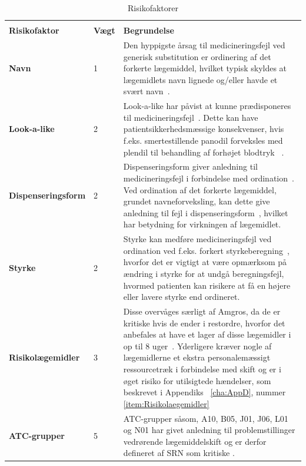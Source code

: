 \begin{longtable}{p{3.5cm}| p{1.0cm} | p{9.2cm}}
	\caption{Risikofaktorer} \vspace{0.2cm}
	\label{table:features} \\
\cellcolor[HTML]{C0C0C0} {\textbf{Risikofaktor}} & \cellcolor[HTML]{C0C0C0} {\textbf{Vægt}} & \cellcolor[HTML]{C0C0C0} {\textbf{Begrundelse}} \\ \hline
\textbf{Navn} & 1 & Den hyppigste årsag til medicineringsfejl ved generisk substitution er ordinering af det forkerte lægemiddel, hvilket typisk skyldes at lægemidlets navn lignede og/eller havde et svært navn~\citep{Hakonsen2010}. \\  \hline 
\textbf{Look-a-like} & 2 & Look-a-like har påvist at kunne prædisponeres til medicineringsfejl~\citep{Wittich2014}. Dette kan have patientsikkerhedsmæssige konsekvenser, hvis f.eks. smertestillende panodil forveksles med plendil til behandling af forhøjet blodtryk ~\citep{DanskSelskabforPatientsikkerhed2009}.\\  \hline 
\textbf{Dispenseringsform} & 2 & Dispenseringsform giver anledning til medicineringsfejl i forbindelse med ordination~\citep{Agrawal2009}. Ved ordination af det forkerte lægemiddel, grundet navneforveksling, kan dette give anledning til fejl i dispenseringsform~\citep{DanskSelskabforPatientsikkerhed2009}, hvilket har betydning for virkningen af lægemidlet.
\\ \hline 
\textbf{Styrke} & 2 & Styrke kan medføre medicineringsfejl ved ordination ved f.eks. forkert styrkeberegning~\citep{Agrawal2009}, hvorfor det er vigtigt at være opmærksom på  ændring i styrke for at undgå beregningsfejl, hvormed patienten kan risikere at få en højere eller lavere styrke end ordineret.\\ \hline
\textbf{Risikolægemidler} & 3 & Disse overvåges særligt af Amgros, da de er kritiske hvis de ender i restordre, hvorfor det anbefales at have et lager af disse lægemidler i op til 8 uger~\citep{Amgros}. Yderligere kræver nogle af lægemidlerne et ekstra personalemæssigt ressourcetræk i forbindelse med skift og er i øget risiko for utilsigtede hændelser, som beskrevet i Appendiks ~\ref{cha:AppD}, nummer \ref{item:Risikolaegemidler}  \\ \hline 
\textbf{ATC-grupper} & 5 & ATC-grupper såsom, A10, B05, J01, J06, L01 og N01 har givet anledning til problemstillinger vedrørende lægemiddelskift og er derfor defineret af SRN som kritiske \citep{SRN}.

\end{longtable}
